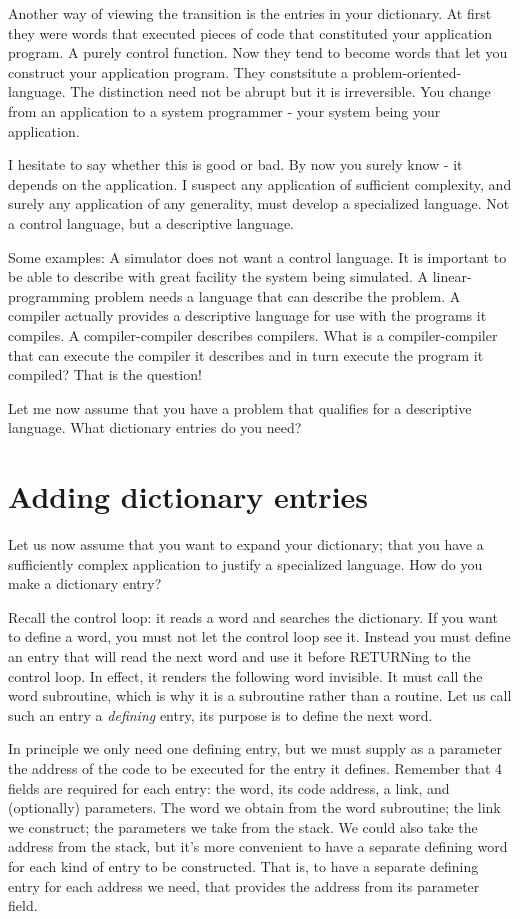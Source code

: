 \documentclass[b5paper, oneside]{book}
\begin{document}
Another way of viewing the transition is the entries in your dictionary. At first they were words that executed pieces of code that constituted your application program. A purely control function. Now they tend to become words that let you construct your application program. They constsitute a problem-oriented-language. The distinction need not be abrupt but it is irreversible. You change from an application to a system programmer - your system being your application.

I hesitate to say whether this is good or bad. By now you surely know - it depends on the application. I suspect any application of sufficient complexity, and surely any application of any generality, must develop a specialized language. Not a control language, but a descriptive language.

Some examples: A simulator does not want a control language. It is important to be able to describe with great facility the system being simulated. A linear-programming problem needs a language that can describe the problem. A compiler actually provides a descriptive language for use with the programs it compiles. A compiler-compiler describes compilers. What is a compiler-compiler that can execute the compiler it describes and in turn execute the program it compiled? That is the question!

Let me now assume that you have a problem that qualifies for a descriptive language. What dictionary entries do you need?

\section{Adding dictionary entries}
Let us now assume that you want to expand your dictionary; that you have a sufficiently complex application to justify a specialized language. How do you make a dictionary entry?

Recall the control loop: it reads a word and searches the dictionary. If you want to define a word, you must not let the control loop see it. Instead you must define an entry that will read the next word and use it before RETURNing to the control loop. In effect, it renders the following word invisible. It must call the word subroutine, which is why it is a subroutine rather than a routine. Let us call such an entry a {\em defining} entry, its purpose is to define the next word.

In principle we only need one defining entry, but we must supply as a parameter the address of the code to be executed for the entry it defines. Remember that 4 fields are required for each entry: the word, its code address, a link, and (optionally) parameters. The word we obtain from the word subroutine; the link we construct; the parameters we take from the stack. We could also take the address from the stack, but it's more convenient to have a separate defining word for each kind of entry to be constructed. That is, to have a separate defining entry for each address we need, that provides the address from its parameter field.
\end{document}
